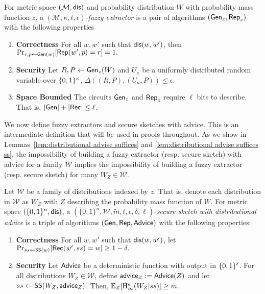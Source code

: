 \begin{definition}
For metric space $(\mathcal{M}, \mathsf{dis})$ and probability distribution $W$ with probability mass function $z$, a $(\mathcal{M}, \kappa, t, \epsilon)$-\emph{fuzzy extractor} is a pair of algorithms $({\mathsf{Gen}}_z, {\mathsf{Rep}}_z)$ with the following properties 
\begin{enumerate} 
\itemsep0em
\item \textbf{Correctness} For all $w, w'$ such that $\mathsf{dis}(w, w')$, then 
$\Pr_{r, p \leftarrow {\ensuremath{\mathsf{Gen}}}(w)}[{\mathsf{Rep}}(w', p) = r]=1.$ 
\item \textbf{Security} Let $R, P \leftarrow {\ensuremath{\mathsf{Gen}}}_z(W)$ and $U_\kappa$ be a uniformly distributed random variable over $\{0, 1\}^\kappa$, $\Delta((R, P), (U_\kappa, P))\le \epsilon.$
\item  \textbf{Space Bounded} The circuits ${\mathsf{Gen}}_z$ and ${\mathsf{Rep}}_z$ require $\ell$ bits to describe.  That is, $|{\mathsf{Gen}}| +|{\mathsf{Rec}}|\le \ell$.
\end{enumerate}
\label{def:fe}
\end{definition}

\noindent
We now define fuzzy extractors and secure sketches with advice.  This is an intermediate definition that will be used in proofs throughout.  As we show in Lemmas~\ref{lem:distributional advise suffices} and \ref{lem:distributional advise suffices ss}, the impossibility of building a fuzzy extractor (resp. secure sketch) with advice for a family $\mathcal{W}$ implies the impossibility of building a fuzzy extractor (resp. secure sketch) for many $W_Z\in\mathcal{W}$.

\begin{definition}
\label{def:ss distributional}
Let $\mathcal{W}$ be a family of distributions indexed by $z$.  That is, denote each distribution in $\mathcal{W}$ as $W_Z$ with $Z$ describing the probability mass function of $W$.  
For metric space $(\{0,1\}^n, \mathsf{dis})$, a $(\{0,1\}^n, \mathcal{W}, \tilde{m}, t, \epsilon, \delta, \ell)$-\emph{secure sketch with distributional advice} is a triple of algorithms $({\mathsf{Gen}}, {\mathsf{Rep}}, {\mathsf{Advice}})$ with the following properties:
\begin{enumerate} 
\itemsep0em
\item \textbf{Correctness} For all $w, w'$ such that $\mathsf{dis}(w, w')$, let $\Pr_{ss \leftarrow {\ensuremath{\mathsf{SS}}}(w)}[{\mathsf{Rec}}(w', ss) = w]\ge 1-\delta.$
\item \textbf{Security} Let ${\mathsf{Advice}}$ be a deterministic function with output in $\{0, 1\}^\ell$.  For all distributions $W_Z \in \mathcal{W}$, define ${\mathsf{advice}}_Z:= {\mathsf{Advice}}(Z)$ and let $ss \leftarrow {\ensuremath{\mathsf{SS}}}(W_Z, {\mathsf{advice}}_Z)$. Then,
$
\operatorname*{\mathbb{E}}_{Z} [\tilde{\mathrm{H}}_\infty^\epsilon(W_Z| ss)] \ge \tilde{m}.
$
\end{enumerate}
\end{definition}


